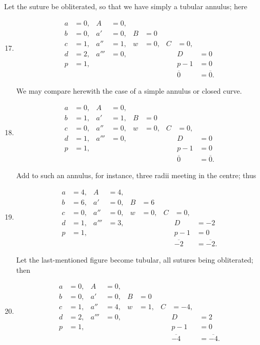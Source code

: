 \documentclass[11pt,a4paper]{article}
\theoremstyle{plain}
\theoremstyle{definition}
\begin{document}
\clearpage

Let the suture be obliterated, so that we have simply a tubular annulus; here

\begin{enumerate}
\setcounter{enumi}{16}
\item
\begin{align*}
a &= 0, & A &= 0, \\
b &= 0, & a' &= 0, & B &= 0 \\
c &= 1, & a'' &= 1, & w &= 0, & C &= 0, \\
d &= 2, & a''' &= 0, & & & & D &= 0 \\
p &= 1, & & & & & & p - 1 &= 0 \\[2pt]
& & & & & & & \overline{0} &= \overline{0}.
\end{align*}

We may compare herewith the case of a simple annulus or closed curve.

\item
\begin{align*}
a &= 0, & A &= 0, \\
b &= 1, & a' &= 1, & B &= 0 \\
c &= 0, & a'' &= 0, & w &= 0, & C &= 0, \\
d &= 1, & a''' &= 0, & & & & D &= 0 \\
p &= 1, & & & & & & p - 1 &= 0 \\[2pt]
& & & & & & & \overline{0} &= \overline{0}.
\end{align*}

Add to such an annulus, for instance, three radii meeting in the centre; thus

\item
\begin{align*}
a &= 4, & A &= 4, \\
b &= 6, & a' &= 0, & B &= 6 \\
c &= 0, & a'' &= 0, & w &= 0, & C &= 0, \\
d &= 1, & a''' &= 3, & & & & D &= -2 \\
p &= 1, & & & & & & p - 1 &= 0 \\[2pt]
& & & & & & & \overline{-2} &= \overline{-2}.
\end{align*}

Let the last-mentioned figure become tubular, all sutures being obliterated; then

\item
\begin{align*}
a &= 0, & A &= 0, \\
b &= 0, & a' &= 0, & B &= 0 \\
c &= 1, & a'' &= 4, & w &= 1, & C &= -4, \\
d &= 2, & a''' &= 0, & & & & D &= 2 \\
p &= 1, & & & & & & p - 1 &= 0 \\[2pt]
& & & & & & & \overline{-4} &= \overline{-4}.
\end{align*}


\end{enumerate}
\end{document}
